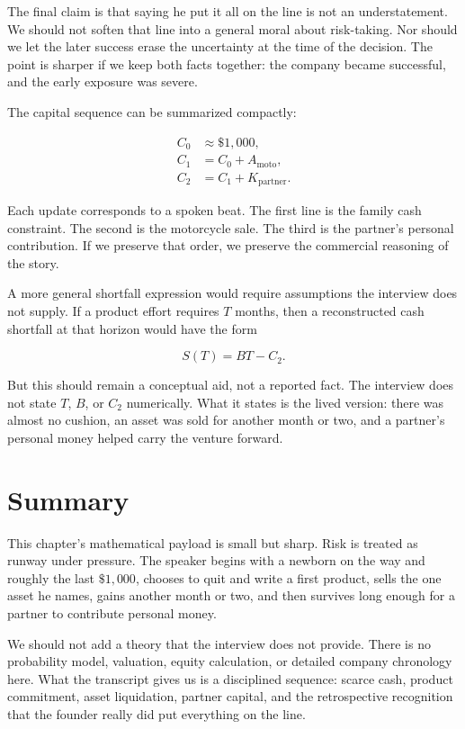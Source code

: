The final claim is that saying he put it all on the line is not an understatement. We should not soften that line into a general moral about risk-taking. Nor should we let the later success erase the uncertainty at the time of the decision. The point is sharper if we keep both facts together: the company became successful, and the early exposure was severe.

The capital sequence can be summarized compactly:

\begin{align}
C_0 &\approx \$1{,}000, \\
C_1 &= C_0 + A_{\mathrm{moto}}, \\
C_2 &= C_1 + K_{\mathrm{partner}}.
\end{align}

Each update corresponds to a spoken beat. The first line is the family cash constraint. The second is the motorcycle sale. The third is the partner's personal contribution. If we preserve that order, we preserve the commercial reasoning of the story.

A more general shortfall expression would require assumptions the interview does not supply. If a product effort requires \(T\) months, then a reconstructed cash shortfall at that horizon would have the form

\begin{equation}
S(T) = BT - C_2 .
\end{equation}

But this should remain a conceptual aid, not a reported fact. The interview does not state \(T\), \(B\), or \(C_2\) numerically. What it states is the lived version: there was almost no cushion, an asset was sold for another month or two, and a partner's personal money helped carry the venture forward.

\section{Summary}

This chapter's mathematical payload is small but sharp. Risk is treated as runway under pressure. The speaker begins with a newborn on the way and roughly the last \(\$1{,}000\), chooses to quit and write a first product, sells the one asset he names, gains another month or two, and then survives long enough for a partner to contribute personal money.

We should not add a theory that the interview does not provide. There is no probability model, valuation, equity calculation, or detailed company chronology here. What the transcript gives us is a disciplined sequence: scarce cash, product commitment, asset liquidation, partner capital, and the retrospective recognition that the founder really did put everything on the line.